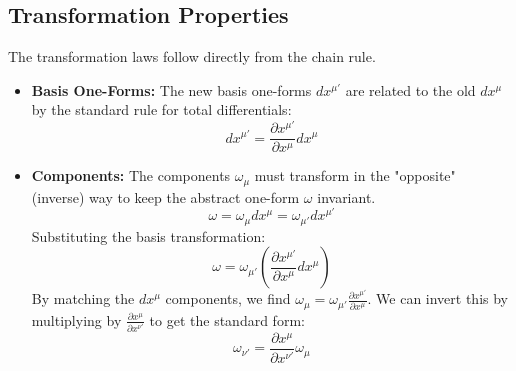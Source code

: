 \documentclass[11pt, a4paper]{report}
\begin{document}
\subsection*{Transformation Properties}
The transformation laws follow directly from the chain rule.
\begin{itemize}
    \item \textbf{Basis One-Forms:} The new basis one-forms $dx^{\mu'}$ are related to the old $dx^\mu$ by the standard rule for total differentials:
    \begin{equation}
        dx^{\mu'} = \frac{\partial x^{\mu'}}{\partial x^\mu} dx^\mu
    \end{equation}
    \item \textbf{Components:} The components $\omega_\mu$ must transform in the "opposite" (inverse) way to keep the abstract one-form $\omega$ invariant.
    \[
        \omega = \omega_\mu dx^\mu = \omega_{\mu'} dx^{\mu'}
    \]
    Substituting the basis transformation:
    \[
        \omega = \omega_{\mu'} \left( \frac{\partial x^{\mu'}}{\partial x^\mu} dx^\mu \right)
    \]
    By matching the $dx^\mu$ components, we find $\omega_\mu = \omega_{\mu'} \frac{\partial x^{\mu'}}{\partial x^\mu}$. We can invert this by multiplying by $\frac{\partial x^\mu}{\partial x^{\nu'}}$ to get the standard form:
    \begin{equation}
        \omega_{\nu'} = \frac{\partial x^\mu}{\partial x^{\nu'}} \omega_\mu
    \end{equation}
\end{itemize}
\end{document}
